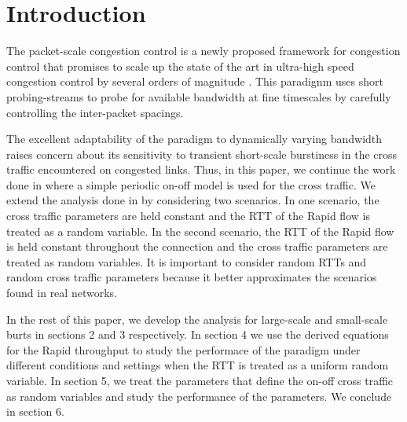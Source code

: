 \section{Introduction}
  The packet-scale congestion control is a newly proposed framework for 
  congestion control that promises to scale up the state of the art in 
  ultra-high speed congestion control by several orders of magnitude 
  \cite{Konda-infocom09}. This paradignm uses short probing-streams to probe 
  for available bandwidth at fine timescales by carefully controlling the 
  inter-packet spacings.

  The excellent adaptability of the paradigm to dynamically varying 
  bandwidth raises concern about its sensitivity to transient short-scale 
  burstiness in the cross traffic encountered on congested links. Thus, in 
  this paper, we continue the work done in \cite{Lovewell2011-Noise-TR} where 
  a simple periodic on-off model is used for the cross traffic. We extend the 
  analysis done in \cite{Lovewell2011-Noise-TR} by considering two scenarios.
  In one scenario, the cross traffic parameters are held constant and the RTT 
  of the Rapid flow is treated as a random variable. In the second 
  scenario, the RTT of the Rapid flow is held constant throughout the 
  connection and the cross traffic parameters are treated as random variables. 
  It is important to consider random RTTs and random cross traffic parameters 
  because it better approximates the scenarios found in real networks.

  In the rest of this paper, we develop the analysis for large-scale and 
  small-scale burts in sections 2 and 3 respectively. In section 4 we use 
  the derived equations for the Rapid throughput to study the performace of 
  the paradigm under different conditions and settings when the RTT is treated 
  as a uniform random variable. In section 5, we treat the parameters that 
  define the on-off cross traffic as random variables and study the 
  performance of the parameters. We conclude in section 6.
